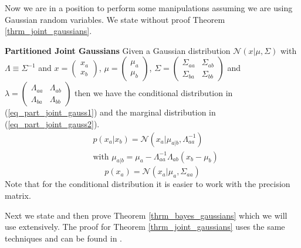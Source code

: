 Now we are in a position to perform some manipulations assuming we are using Gaussian random variables. We state without proof Theorem \ref{thrm_joint_gaussians}.
\begin{thrm}
\textbf{Partitioned Joint Gaussians}
Given a Gaussian distribution $\mathcal{N}(x|\mu,\Sigma)$ with $\Lambda \equiv \Sigma^{-1}$ and $x=\begin{pmatrix}
x_a \\ x_b
\end{pmatrix}$, $\mu=\begin{pmatrix}
\mu_a \\ \mu_b
\end{pmatrix}$, $\Sigma=\begin{pmatrix}
\Sigma_{aa} & \Sigma_{ab} \\ \Sigma_{ba} & \Sigma_{bb}
\end{pmatrix}$ and $\lambda = \begin{pmatrix}
\Lambda_{aa} & \Lambda_{ab} \\ \Lambda_{ba} & \Lambda_{bb}
\end{pmatrix}$ then we have the conditional distribution in (\ref{eq_part_joint_gauss1}) and the marginal distribution in (\ref{eq_part_joint_gauss2}).
\begin{equation}
\begin{aligned}
&p(x_a|x_b) = \mathcal{N}(x_a|\mu_{a|b}, \Lambda_{aa}^{-1}) \\
&\text{with } \mu_{a|b} = \mu_a - \Lambda_{aa}^{-1}\Lambda_{ab}(x_b-\mu_b)
\end{aligned}
\label{eq_part_joint_gauss1}
\end{equation}
\begin{equation}
p(x_a) = \mathcal{N}(x_a|\mu_a,\Sigma_{aa})
\label{eq_part_joint_gauss2}
\end{equation}
\label{thrm_joint_gaussians}
Note that for the conditional distribution it is easier to work with the precision matrix. 
\end{thrm}
Next we state and then prove Theorem \ref{thrm_bayes_gaussians} which we will use extensively. The proof for Theorem \ref{thrm_joint_gaussians} uses the same techniques and can be found in \cite{bishop}.

